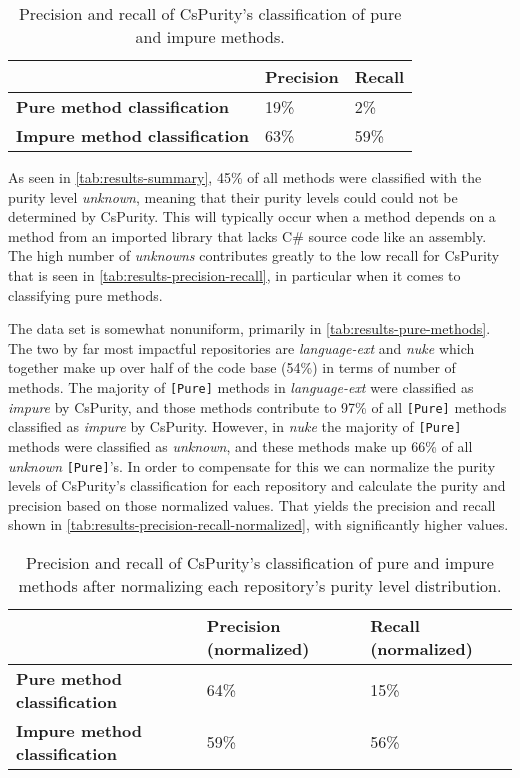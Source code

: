 \documentclass[a4paper,12pt]{article}
\begin{document}
\begin{table}[H]
  \centering
  \caption{Precision and recall of CsPurity's classification of pure and impure methods.}
  \label{tab:results-precision-recall}
  \begin{tabular}{|l|ll|}
    \hline
                                              & \textbf{Precision} & \textbf{Recall} \\
    \hline
    \textbf{Pure method classification}   & 19\%               & 2\%             \\
    \textbf{Impure method classification} & 63\%               & 59\%            \\
    \hline
  \end{tabular}
\end{table}

As seen in \autoref{tab:results-summary}, 45\% of all methods were classified with the purity level \textit{unknown}, meaning that their purity levels could could not be determined by CsPurity. This will typically occur when a method depends on a method from an imported library that lacks C\# source code like an assembly. The high number of \textit{unknowns} contributes greatly to the low recall for CsPurity that is seen in \autoref{tab:results-precision-recall}, in particular when it comes to classifying pure methods.

The data set is somewhat nonuniform, primarily in \autoref{tab:results-pure-methods}. The two by far most impactful repositories are \textit{language-ext} and \textit{nuke} which together make up over half of the code base (54\%) in terms of number of methods. The majority of \texttt{[Pure]} methods in \textit{language-ext} were classified as \textit{impure} by CsPurity, and those methods contribute to 97\% of all \texttt{[Pure]} methods classified as \textit{impure} by CsPurity. However, in \textit{nuke} the majority of \texttt{[Pure]} methods were classified as \textit{unknown}, and these methods make up 66\% of all \textit{unknown} \texttt{[Pure]}'s. In order to compensate for this we can normalize the purity levels of CsPurity's classification for each repository and calculate the purity and precision based on those normalized values. That yields the precision and recall shown in \autoref{tab:results-precision-recall-normalized}, with significantly higher values.

\begin{table}[H]
  \centering
  \caption{Precision and recall of CsPurity's classification of pure and impure methods after normalizing each repository's purity level distribution.}
  \label{tab:results-precision-recall-normalized}
  \begin{tabular}{|l|ll|}
    \hline
                                          & \textbf{Precision (normalized)} & \textbf{Recall (normalized)} \\
    \hline
    \textbf{Pure method classification}   & 64\%                            & 15\%                         \\
    \textbf{Impure method classification} & 59\%                            & 56\%                         \\
    \hline
  \end{tabular}
\end{table}
\end{document}
